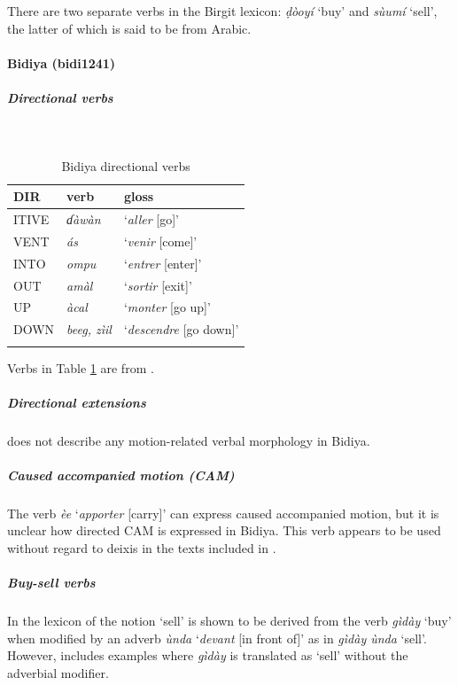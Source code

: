 There are two separate verbs in the Birgit lexicon: \textit{ḍòoyí} `buy' and \textit{sùumí} `sell', the latter of which is said to be from Arabic.

\newpage
\paragraph*{Bidiya (bidi1241)} \label{bidi}

\subparagraph{Directional verbs}~

\begin{table}[H]
	\caption{Bidiya directional verbs} 
	\label{tab:bidiV}
	\begin{tabular}{lll} %
		\lsptoprule
		DIR & verb & gloss   \\ %
		\midrule
		ITIVE & \textit{ɗàwàn} & `\textit{aller} [go]' \\
		VENT & \textit{ás} & `\textit{venir} [come]' \\
		INTO& \textit{ompu} & `\textit{entrer} [enter]' \\
		OUT & \textit{amàl} & `\textit{sortir} [exit]' \\
		UP & \textit{àcal} & `\textit{monter} [go up]' \\
		DOWN & \textit{beeg, zìil} & `\textit{descendre} [go down]' \\
		\lspbottomrule
	\end{tabular}
\end{table}

Verbs in Table \ref{tab:bidiV} are from \citet{alioLexiqueBidiya1989}.

\subparagraph{Directional extensions}
\citet{alioEssaiDescriptionLangue1986} does not describe any motion-related verbal morphology in Bidiya. 

\subparagraph{Caused accompanied motion (CAM)}

The verb \textit{èe} `\textit{apporter} [carry]' can express caused accompanied motion, but it is unclear how directed CAM is expressed in Bidiya. This verb appears to be used without regard to deixis in the texts included in \citet{seibelParticipantReferenceBidiya2015}.

\subparagraph{Buy-sell verbs}

In the lexicon of \citet[78]{alioLexiqueBidiya1989} the notion `sell' is shown to be derived from the verb \textit{gìdày} `buy' when modified by an adverb \textit{ùnda} `\textit{devant} [in front of]' as in \textit{gìdày ùnda} `sell'. However, \citet[29, 44, 77]{seibelParticipantReferenceBidiya2015} includes examples where \textit{gìdày} is translated as `sell' without the adverbial modifier.

